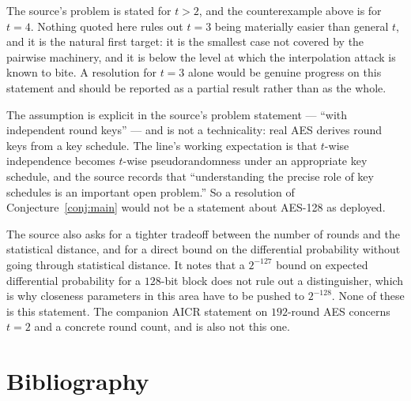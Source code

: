 \documentclass{aicr-conjecture}
\begin{document}
\begin{remark}[Where $t = 3$ sits]\label{rem:three}
The source's problem is stated for $t > 2$, and the counterexample above
is for $t = 4$. Nothing quoted here rules out $t = 3$ being materially
easier than general $t$, and it is the natural first target: it is the
smallest case not covered by the pairwise machinery, and it is below the
level at which the interpolation attack is known to bite. A resolution
for $t = 3$ alone would be genuine progress on this statement and should
be reported as a partial result rather than as the whole.
\end{remark}

\begin{remark}\label{rem:keys}
The assumption is explicit in the source's problem statement --- ``with
independent round keys'' --- and is not a technicality: real AES derives
round keys from a key schedule. The line's working expectation is that
$t$-wise independence becomes $t$-wise pseudorandomness under an
appropriate key schedule, and the source records that ``understanding the
precise role of key schedules is an important open problem.'' So a
resolution of Conjecture~\ref{conj:main} would not be a statement about
AES-128 as deployed.
\end{remark}

\begin{remark}\label{rem:neighbours}
The source also asks for a tighter tradeoff between the number of rounds
and the statistical distance, and for a direct bound on the differential
probability without going through statistical distance. It notes that a
$2^{-127}$ bound on expected differential probability for a $128$-bit
block does not rule out a distinguisher, which is why closeness
parameters in this area have to be pushed to $2^{-128}$. None of these is
this statement. The companion AICR statement on $192$-round AES
concerns $t = 2$ and a concrete round count, and is also not this one.
\end{remark}

\section{Bibliography}
\end{document}
